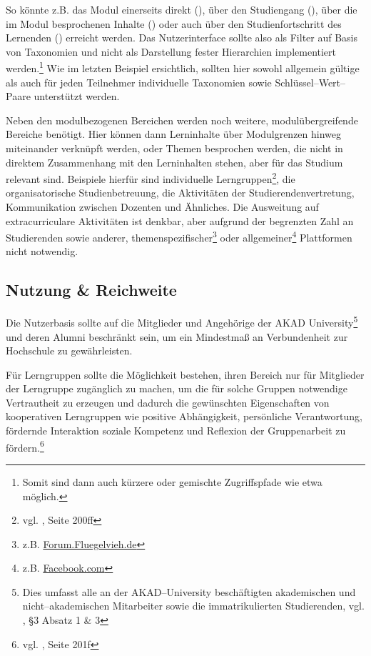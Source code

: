 So könnte z.B. das Modul  einerseits direkt (), über den Studiengang (), über die im Modul besprochenen Inhalte () oder auch über den Studienfortschritt des Lernenden () erreicht werden. Das Nutzerinterface sollte also als Filter auf Basis von Taxonomien und nicht als Darstellung fester Hierarchien implementiert werden.\footnote{Somit sind dann auch kürzere oder gemischte Zugriffspfade wie etwa  möglich.} Wie im letzten Beispiel ersichtlich, sollten hier sowohl allgemein gültige als auch für jeden Teilnehmer individuelle Taxonomien sowie Schlüssel–Wert–Paare unterstützt werden.

Neben den modulbezogenen Bereichen werden noch weitere, modulübergreifende Bereiche benötigt. Hier können dann Lerninhalte über Modulgrenzen hinweg miteinander verknüpft werden, oder Themen besprochen werden, die nicht in direktem Zusammenhang mit den Lerninhalten stehen, aber für das Studium relevant sind. Beispiele hierfür sind individuelle Lerngruppen\footnote{vgl. \cite{cscl:wessner}, Seite 200ff}, die organisatorische Studienbetreuung, die Aktivitäten der Studierendenvertretung, Kommunikation zwischen Dozenten und Ähnliches. Die Ausweitung auf extracurriculare Aktivitäten ist denkbar, aber aufgrund der begrenzten Zahl an Studierenden sowie anderer, themenspezifischer\footnote{z.B. \url{Forum.Fluegelvieh.de}} oder allgemeiner\footnote{z.B. \url{Facebook.com}} Plattformen nicht notwendig.

\subsection{Nutzung \& Reichweite} %
\label{sub:reichweite}
Die Nutzerbasis sollte auf die Mitglieder und Angehörige der AKAD University\footnote{Dies umfasst alle an der AKAD–University beschäftigten akademischen und nicht–akademischen Mitarbeiter sowie die immatrikulierten Studierenden, vgl. \cite{akad:go}, §3 Absatz 1 \& 3} und deren Alumni beschränkt sein, um ein Mindestmaß an Verbundenheit zur Hochschule zu gewährleisten. 

Für Lerngruppen sollte die Möglichkeit bestehen, ihren Bereich nur für Mitglieder der Lerngruppe zugänglich zu machen, um die für solche Gruppen notwendige Vertrautheit zu erzeugen und dadurch die gewünschten Eigenschaften von kooperativen Lerngruppen wie positive Abhängigkeit, persönliche Verantwortung, fördernde Interaktion soziale Kompetenz und Reflexion der Gruppenarbeit zu fördern.\footnote{vgl. \cite{cscl:wessner}, Seite 201f}

